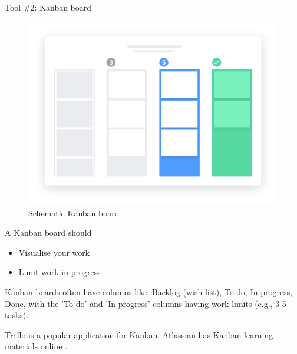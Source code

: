 \documentclass[aspectratio=43, 11pt]{beamer} %
\begin{document}
\begin{frame}{Tool \#2: Kanban board}
 \begin{figure}[Kanban]
    \centering
        \includegraphics[height=.75\textheight]{figures/kanban.png}
        \caption{Schematic Kanban board \cite{Atlassian2019-bo}}
        \label{fig:9}
 \end{figure}
\end{frame}

\begin{frame}{A Kanban board should}
    \begin{itemize}[label=\textbullet]
        \item Visualise your work
        \item Limit work in progress
    \end{itemize}
Kanban boards often have columns like: Backlog (wish list), To do, In progress, Done, with the 'To do' and 'In progress' columns having work limits (e.g., 3-5 tasks). 

Trello is a popular application for Kanban. Atlassian has Kanban learning materials online \cite{Atlassian2019-bo}.
\end{frame}


\end{document}
